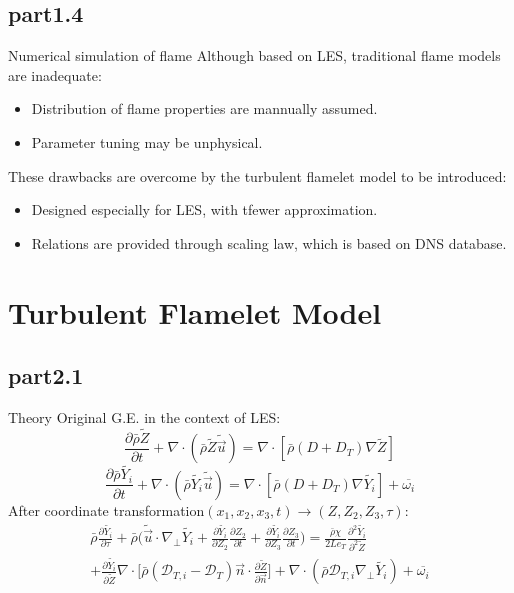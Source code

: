	\subsection{part1.4}
		\begin{xframe}{Numerical simulation of flame}
			Although based on LES, traditional flame models are inadequate:
			\begin{itemize}
				\item
					Distribution of flame properties are mannually assumed.
				\item
					Parameter tuning may be unphysical.
			\end{itemize}
			These drawbacks are overcome by the turbulent flamelet model to be introduced:
			\begin{itemize}
				\item
					Designed especially for LES, with tfewer approximation.
				\item
					Relations are provided through scaling law, which is based on DNS database.
			\end{itemize}		
		\end{xframe}
\section{Turbulent Flamelet Model}
	\subsection{part2.1}
		\begin{xframe}{Theory}
			Original G.E. in the context of LES:
			\begin{equation}
				\frac{\partial \bar{\rho}\tilde{Z}}{\partial t} + \nabla \cdot (\bar{\rho} \tilde{Z}\tilde{\vec{u}}) = \nabla \cdot [\bar{\rho}(D+D_T)\nabla\tilde{Z}]
			\end{equation}
			\begin{equation}
				\frac{\partial \bar{\rho}\tilde{Y_i}}{\partial t} + \nabla \cdot (\bar{\rho} \tilde{Y_i}\tilde{\vec{u}}) = \nabla \cdot [\bar{\rho}(D+D_T)\nabla\tilde{Y_i}] + \overline{\omega_i}
			\end{equation}
			After coordinate transformation$(x_1,x_2,x_3,t)\rightarrow(Z,Z_2,Z_3,\tau)$:
			\begin{equation}
				\begin{split}
					\bar{\rho}\frac{\partial \tilde{Y_i}}{\partial \tau} + \bar{\rho} \Big(\tilde{\vec{u}} \cdot \nabla_\perp \tilde{Y_i} + \frac{\partial \tilde{Y_i}}{\partial Z_2}\frac{\partial Z_2}{\partial t} + \frac{\partial \tilde{Y_i}}{\partial Z_3}\frac{\partial Z_3}{\partial t}\Big) = \frac{\bar{\rho}\chi}{2Le_T}\frac{\partial^2 \tilde{Y_i}}{\partial^2 \tilde{Z}}\\ + \frac{\partial \tilde{Y_i}}{\partial \tilde{Z}}\nabla\cdot\Bigg[\bar{\rho}(\mathcal{D}_{T,i}-\mathcal{D}_T)\vec{n}\cdot\frac{\partial \tilde{Z}}{\partial \vec{n}}\Bigg] + \nabla \cdot (\bar{\rho}\mathcal{D}_{T,i}\nabla_\perp\tilde{Y_i}) + \overline{\omega_i}
				\end{split}	
			\end{equation}
		\end{xframe}
